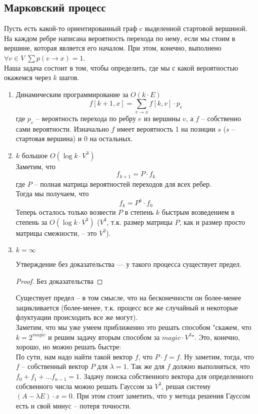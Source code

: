 \subsection{Марковский процесс}

Пусть есть какой-то ориентированный граф c выделенной стартовой вершиной. На каждом ребре написана вероятность перехода по нему, если мы 
стоим в вершине, которая является его началом. При этом, конечно, выполнено $\forall v \in V \; \sum p(v \rightarrow x) = 1$.\\
Наша задача состоит в том, чтобы определить, где мы с какой вероятностью окажемся через $k$ шагов.

\begin{enumerate}
\item Динамическим программирование за $O(k \cdot E)$\\
$$f[k + 1, x] = \sum_{v \rightarrow x} f[k, v] \cdot p_e$$
где $p_e$ -- вероятность перехода по ребру $e$ из вершины $v$, а $f$ -- собственно сами вероятности. Изначально $f$ имеет вероятность 1 на
позиции $s$ ($s$ -- стартовая вершина) и 0 на остальных.
\item $k$ большое $O(\log k \cdot V^3)$\\
Заметим, что
$$f_{k + 1} = P \cdot f_k$$
где $P$ -- полная матрица вероятностей переходов для всех ребер.\\
Тогда мы получаем, что 
$$f_k = P^k \cdot f_0$$
Теперь осталось только возвести $P$ в степень $k$ быстрым возведением в степень за $O(\log k \cdot V^3)$ ($V^3$, т.к. размер матрицы $P$,
как и размер просто матрицы смежности, -- это $V^2$).
\item $k = \infty$\\
\begin{theorem}{}
Утверждение без доказательства --- у такого процесса существует предел.
\end{theorem}
\begin{proof}
Без доказательства
\end{proof}

Существует предел -- в том смысле, что на бесконечности он более-менее зацикливается
(более-менее, т.к. процесс все же случайный и некоторые флуктуации происходить все же могут).\\
Заметим, что мы уже умеем приближенно это решать способом "скажем, что $k = 2^{magic}$ и решим задачу вторым способом за $magic \cdot V^3$".
Это, конечно, хорошо, но можно решать быстре:\\
По сути, нам надо найти такой вектор $f$, что $P \cdot f = f$. Ну заметим, тогда, что $f$ -- собственный вектор
$P$ для $\lambda = 1$. Так же для $f$ должно выполняться, что $f_0 + f_1 + \dots f_{n - 1} = 1$. Задачу поиска собственного вектора для
определенного собсвенного числа можно решать Гауссом за $V^3$, решая систему $(A - \lambda E) \cdot x = 0$. При этом стоит заметить, что 
у метода решения Гауссом есть и свой минус -- потеря точности.
\end{enumerate}

